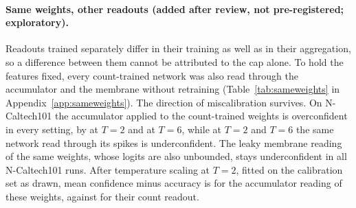 \documentclass[10pt]{article}
\begin{document}
\paragraph{Same weights, other readouts (added after review, not pre-registered; exploratory).}
Readouts trained separately differ in their training as well as in their aggregation, so a
difference between them cannot be attributed to the cap alone. To hold the features fixed, every
count-trained network was also read through the accumulator and the membrane without retraining
(Table~\ref{tab:sameweights} in Appendix~\ref{app:sameweights}). The direction of miscalibration
survives. On N-Caltech101 the accumulator applied to the count-trained weights is overconfident in
every setting, by \swNcTwoAccumGap{} at $T=2$ and \swNcSixAccumGap{} at $T=6$, while at $T=2$ and %
$T=6$ the same network read through its spikes is underconfident. The leaky membrane reading of the
same weights, whose logits are also unbounded, stays underconfident in all \swNcMemUnderRuns{} %
N-Caltech101 runs. After temperature scaling at $T=2$, fitted on the calibration set as drawn, mean %
confidence minus accuracy is \swNcTwoAccumGapTemp{} for the accumulator reading of these weights, %
against \gapCalNcTwoTemp{} for their count readout. %
\end{document}
